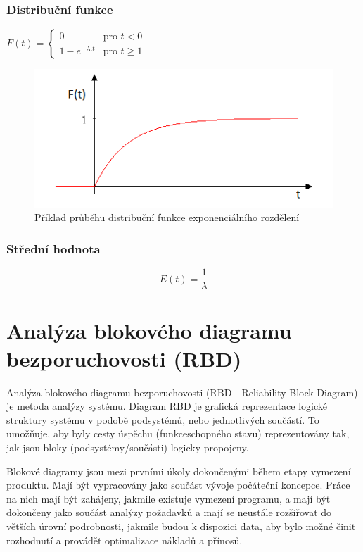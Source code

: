 \documentclass[FM,RP]{tulthesis}
\begin{document}
        \subsubsection*{Distribuční funkce}
            $  F(t) = \left\{ \begin{array}{ll}
                0 & \mbox{pro }t<0 \\
                1-e^{-\lambda.t} & \mbox{pro }t\geq 1
                \end{array} \right. $
            \begin{figure}[h]
                \centering
                \includegraphics[scale=0.75]{pic/distrib.png}
                \caption{Příklad průběhu distribuční funkce exponenciálního rozdělení} 
            \end{figure}
        \subsubsection*{Střední hodnota}
            $$ E(t) = \frac{1}{\lambda}  $$
        

    
   
    \section*{Analýza blokového diagramu bezporuchovosti (RBD)}

        Analýza blokového diagramu bezporuchovosti (RBD - Reliability Block Diagram) je metoda analýzy systému. 
        Diagram RBD je grafická reprezentace logické struktury systému v podobě podsystémů, nebo jednotlivých součástí. 
        To umožňuje, aby byly cesty úspěchu (funkceschopného stavu) reprezentovány tak, jak jsou bloky (podsystémy/součásti) logicky propojeny.\cite{1}

        Blokové diagramy jsou mezi prvními úkoly dokončenými během etapy vymezení produktu. 
        Mají být vypracovány jako součást vývoje počáteční koncepce. 
        Práce na nich mají být zahájeny, jakmile existuje vymezení programu, a mají být dokončeny jako součást analýzy požadavků a 
        mají se neustále rozšiřovat do větších úrovní podrobnosti, 
        jakmile budou k dispozici data, aby bylo možné činit rozhodnutí a provádět optimalizace nákladů a přínosů.\cite{2}
\end{document}
